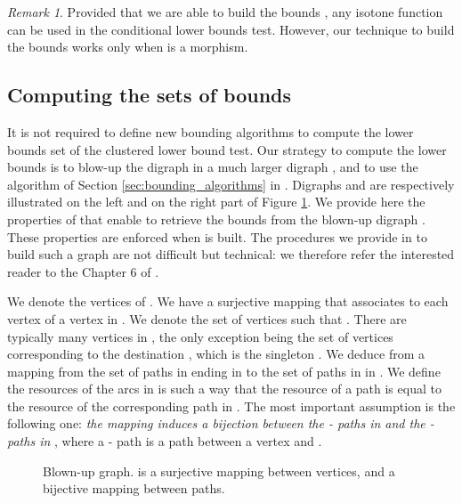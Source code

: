 \documentclass[11pt]{amsart}
\theoremstyle{plain}
\theoremstyle{remark}
\newtheorem{rem}{Remark}
\begin{document}
\begin{rem}
Provided that we are able to build the bounds , any isotone function  can be used in the conditional lower bounds test. However, our technique to build the bounds   works only when  is a morphism.
\end{rem}

\subsection{Computing the sets of bounds} \label{sub:computing_the_set_of_bounds}





It is not required to define new bounding algorithms to compute the lower bounds set of the clustered lower bound test. Our strategy to compute the lower bounds  is to blow-up the  digraph  in a much larger digraph , and to use the algorithm of Section \ref{sec:bounding_algorithms} in .  Digraphs  and  are respectively illustrated on the left and on the right part of Figure \ref{fig:stateGraph1}. We provide here the properties of  that enable to retrieve the bounds  from the blown-up digraph . These properties are enforced when  is built. The procedures we provide in \cite{parmentier2016thesis} to build such a graph  are not difficult but technical: we therefore refer the interested reader to the Chapter 6 of \cite{parmentier2016thesis}.


We denote   the vertices of . We have a surjective mapping  that associates to each vertex  of  a vertex  in . We denote  the set of vertices  such that . There are typically many vertices in , the only exception being the set  of vertices corresponding to the destination , which is the singleton . We deduce from  a mapping  from the set of paths  in  ending in  to the set of paths in  in . We define the resources of the arcs in  is such a way that the resource  of a path  is equal to the resource  of the corresponding path  in . The most important assumption is the following one: \emph{the mapping  induces a bijection between the - paths in  and the - paths in }, where a - path is a path between a vertex  and .


\begin{figure}[!ht]
	\begin{center}
		
		\caption{Blown-up graph.  is a surjective mapping between vertices, and  a bijective mapping between paths.}
		\label{fig:stateGraph1}
	\end{center}
\end{figure} 
\end{document}
